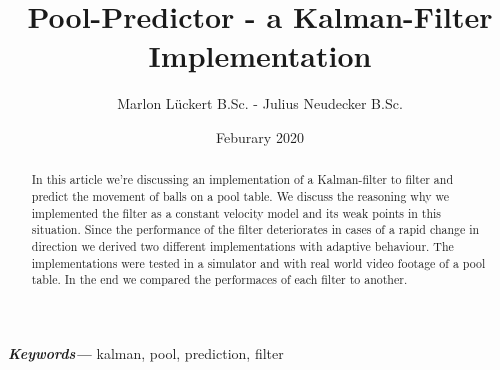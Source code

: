 \documentclass[notitlepage, a4paper, 11pt]{scrartcl}
\providecommand{\keywords}[1]
{
  \small	
  \textbf{\textit{Keywords---}} #1
}
\begin{document}
\title{Pool-Predictor - a Kalman-Filter Implementation}
\author{Marlon Lückert B.Sc. - Julius Neudecker B.Sc.}
\date{Feburary 2020}

\maketitle

\begin{abstract}
In this article we're discussing an implementation of a Kalman-filter \cite{kalman} to filter and predict the movement of balls on a pool table. 
We discuss the reasoning why we implemented the filter as a constant velocity model and its weak points in this situation.
Since the performance of the filter deteriorates in cases of a rapid change in direction we derived two different implementations with adaptive behaviour.
The implementations were tested in a simulator and with real world video footage of a pool table.
In the end we compared the performaces of each filter to another.

\end{abstract}

\keywords{kalman, pool, prediction, filter}
\end{document}
